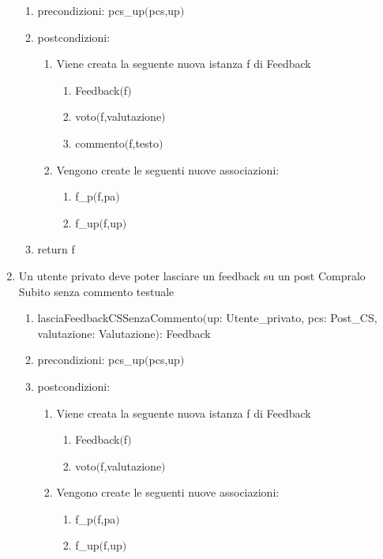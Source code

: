\documentclass{article}
\begin{document}
\begin{enumerate}
\begin{enumerate}
        \item precondizioni: pcs\_up$($pcs,up$)$
        \item postcondizioni:
        \begin{enumerate}
            \item Viene creata la seguente nuova istanza f di Feedback
            \begin{enumerate}
                \item Feedback$($f$)$
                \item voto$($f,valutazione$)$
                \item commento$($f,testo$)$
            \end{enumerate}
            \item Vengono create le seguenti nuove associazioni:
            \begin{enumerate}
                \item f\_p$($f,pa$)$
                \item f\_up$($f,up$)$
            \end{enumerate}
        \end{enumerate}
        \item return f
    \end{enumerate}
    \item Un utente privato deve poter lasciare un feedback su un post Compralo Subito senza commento testuale
    \begin{enumerate}
        \item lasciaFeedbackCSSenzaCommento$($up: Utente\_privato, pcs: Post\_CS, valutazione: Valutazione$)$: Feedback
        \item precondizioni: pcs\_up$($pcs,up$)$
        \item postcondizioni:
        \begin{enumerate}
            \item Viene creata la seguente nuova istanza f di Feedback
            \begin{enumerate}
                \item Feedback$($f$)$
                \item voto$($f,valutazione$)$
            \end{enumerate}
            \item Vengono create le seguenti nuove associazioni:
            \begin{enumerate}
                \item f\_p$($f,pa$)$
                \item f\_up$($f,up$)$

\end{enumerate}
\end{enumerate}
\end{enumerate}
\end{enumerate}
\end{document}
